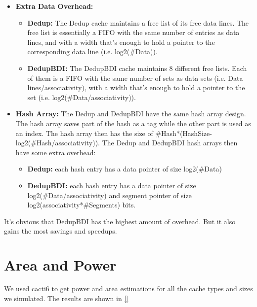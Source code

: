 \begin{itemize}
\begin{itemize}
    \end{itemize}
    \item \textbf{Extra Data Overhead:}
    \begin{itemize}
        \item \textbf{Dedup:} The Dedup cache maintains a free list of its free data lines. The free list is essentially a FIFO with the same number of entries as data lines, and with a width that's enough to hold a pointer to the corresponding data line (i.e. log2(\#Data)).
        \item \textbf{DedupBDI:} The DedupBDI cache maintains 8 different free lists. Each of them is a FIFO with the same number of sets as data sets (i.e. Data lines/associativity), with a width that's enough to hold a pointer to the set (i.e. log2(\#Data/associativity)).
    \end{itemize}
    \item \textbf{Hash Array:} The Dedup and DedupBDI have the same hash array design. The hash array saves part of the hash as a tag while the other part is used as an index. The hash array then has the size of \#Hash*(HashSize-log2(\#Hash/associativity)). The Dedup and DedupBDI hash arrays then have some extra overhead:
    \begin{itemize}
        \item \textbf{Dedup:} each hash entry has a data pointer of size log2(\#Data)
        \item \textbf{DedupBDI:} each hash entry has a data pointer of size log2(\#Data/associativity) and segment pointer of size log2(associativity*\#Segments) bits.
    \end{itemize}
\end{itemize}
It's obvious that DedupBDI has the highest amount of overhead. But it also gains the most savings and speedups.

\section{Area and Power}
\label{sec:areapower}
We used cacti6\cite{cacti} to get power and area estimations for all the cache types and sizes we simulated. The results are shown in \ref{}